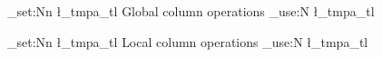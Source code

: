 \documentclass{article}
\begin{document}
\ExplSyntaxOn

{
    \RenewDocumentCommand { \colops } {} {
        \tl_set:Nn \l_tmpa_tl { Global column operations }
        \tl_use:N \l_tmpa_tl
    }
    {
        \RenewDocumentCommand { \colops } {} {
            \tl_set:Nn \l_tmpa_tl { Local column operations }
            \tl_use:N \l_tmpa_tl
        }

        \colops %
    }
    \colops %
}
\colops %

\ExplSyntaxOff
\end{document}
